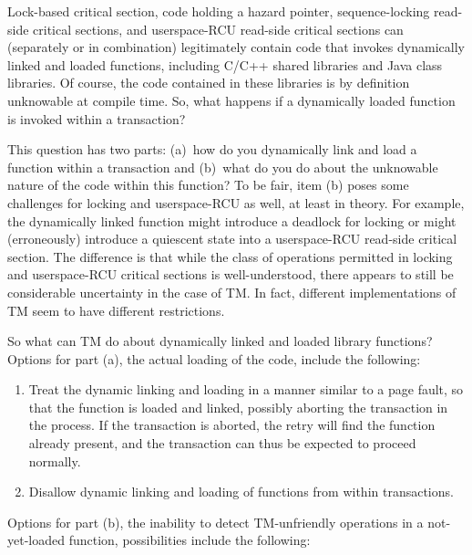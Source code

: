 Lock-based critical section, code holding a hazard pointer,
sequence-locking read-side critical sections, and userspace-RCU read-side
critical sections can (separately or in combination) legitimately contain
code that invokes dynamically linked and loaded functions, including C/C++
shared libraries and Java class libraries.
Of course, the code contained in these libraries is by definition
unknowable at compile time.
So, what happens if a dynamically loaded function is invoked within
a transaction?

This question has two parts: (a)~how do you dynamically link and load a
function within a transaction and (b)~what do you do about the unknowable
nature of the code within this function?
To be fair, item (b) poses some challenges for locking and userspace-RCU
as well, at least in theory.
For example, the dynamically linked function might introduce a deadlock
for locking or might (erroneously) introduce a quiescent state into a
userspace-RCU read-side critical section.
The difference is that while the class of operations permitted in locking
and userspace-RCU critical sections is well-understood, there appears
to still be considerable uncertainty in the case of TM\@.
In fact, different implementations of TM seem to have different restrictions.

So what can TM do about dynamically linked and loaded library functions?
Options for part (a), the actual loading of the code, include the following:

\begin{enumerate}
\item	Treat the dynamic linking and loading in a manner similar to a
	page fault, so that the function is loaded and linked, possibly
	aborting the transaction in the process.
	If the transaction is aborted, the retry will find the function
	already present, and the transaction can thus be expected to
	proceed normally.
\item	Disallow dynamic linking and loading of functions from within
	transactions.
\end{enumerate}

Options for part (b), the inability to detect TM-unfriendly operations
in a not-yet-loaded function, possibilities include the following:

